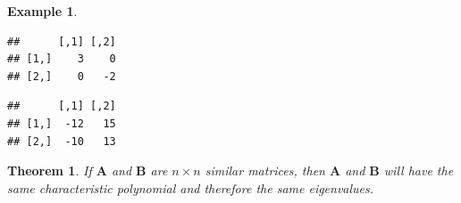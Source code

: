 \documentclass[
]{book}
\newenvironment{Shaded}{\begin{snugshade}}{\end{snugshade}}
\newcommand{\KeywordTok}[1]{\textcolor[rgb]{0.13,0.29,0.53}{\textbf{#1}}}
\newcommand{\NormalTok}[1]{#1}
\newcommand{\OperatorTok}[1]{\textcolor[rgb]{0.81,0.36,0.00}{\textbf{#1}}}
\newcommand{\StringTok}[1]{\textcolor[rgb]{0.31,0.60,0.02}{#1}}
\newtheorem{theorem}{Theorem}[chapter]
\theoremstyle{definition}
\theoremstyle{definition}
\newtheorem{example}{Example}[chapter]
\theoremstyle{definition}
\theoremstyle{definition}
\theoremstyle{remark}
\begin{document}
\begin{example}
\begin{Shaded}
\end{Shaded}

\begin{verbatim}
##      [,1] [,2]
## [1,]    3    0
## [2,]    0   -2
\end{verbatim}

\begin{Shaded}
\end{Shaded}

\begin{verbatim}
##      [,1] [,2]
## [1,]  -12   15
## [2,]  -10   13
\end{verbatim}

\end{example}

\begin{theorem}
If \(\mathbf{A}\) and \(\mathbf{B}\) are \(n \times n\) similar matrices, then \(\mathbf{A}\) and \(\mathbf{B}\) will have the same characteristic polynomial and therefore the same eigenvalues.
\end{theorem}
\end{document}
